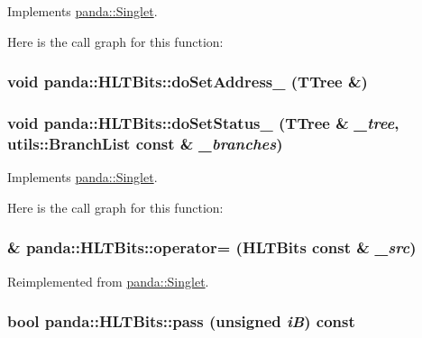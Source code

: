 Implements \hyperlink{classpanda_1_1Singlet_ad5acaa19bf3a8c360cf2e36604ab4530}{panda::Singlet}.

Here is the call graph for this function:\hypertarget{classpanda_1_1HLTBits_a97318f3a21281121aa78a84c3c9027af}{
\subsubsection[{doSetAddress\_\-}]{\setlength{\rightskip}{0pt plus 5cm}void panda::HLTBits::doSetAddress\_\- (TTree \&)}}
\label{classpanda_1_1HLTBits_a97318f3a21281121aa78a84c3c9027af}
\hypertarget{classpanda_1_1HLTBits_ae031e46f650668194269fec06b95ef72}{
\subsubsection[{doSetStatus\_\-}]{\setlength{\rightskip}{0pt plus 5cm}void panda::HLTBits::doSetStatus\_\- (TTree \& {\em \_\-tree}, \/  {\bf utils::BranchList} const \& {\em \_\-branches})}}
\label{classpanda_1_1HLTBits_ae031e46f650668194269fec06b95ef72}


Implements \hyperlink{classpanda_1_1Singlet_a660799e379f7949f3b8e2d74f6e1ddb2}{panda::Singlet}.

Here is the call graph for this function:\hypertarget{classpanda_1_1HLTBits_ac58854e1b3ad1889afb461326f9f6d1c}{
\subsubsection[{operator=}]{ \& panda::HLTBits::operator= ({\bf HLTBits} const \& {\em \_\-src})}}
\label{classpanda_1_1HLTBits_ac58854e1b3ad1889afb461326f9f6d1c}


Reimplemented from \hyperlink{classpanda_1_1Singlet_a161b3df14c430fd7f1afdd64d098b211}{panda::Singlet}.\hypertarget{classpanda_1_1HLTBits_a308783549d0044824efc73b14cd5910f}{
\subsubsection[{pass}]{\setlength{\rightskip}{0pt plus 5cm}bool panda::HLTBits::pass (unsigned {\em iB}) const}}
\label{classpanda_1_1HLTBits_a308783549d0044824efc73b14cd5910f}


